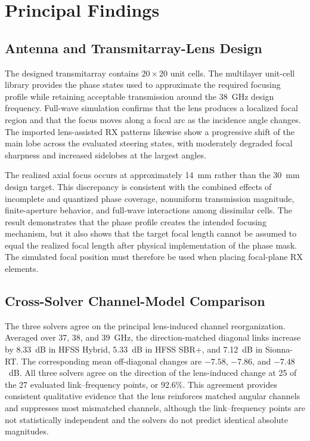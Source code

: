 \section{Principal Findings}

\subsection{Antenna and Transmitarray-Lens Design}

The designed transmitarray contains $20\times20$ unit cells. The multilayer unit-cell library provides the phase states used to approximate the required focusing profile while retaining acceptable transmission around the 38~GHz design frequency. Full-wave simulation confirms that the lens produces a localized focal region and that the focus moves along a focal arc as the incidence angle changes. The imported lens-assisted RX patterns likewise show a progressive shift of the main lobe across the evaluated steering states, with moderately degraded focal sharpness and increased sidelobes at the largest angles.

The realized axial focus occurs at approximately 14~mm rather than the 30~mm design target. This discrepancy is consistent with the combined effects of incomplete and quantized phase coverage, nonuniform transmission magnitude, finite-aperture behavior, and full-wave interactions among dissimilar cells. The result demonstrates that the phase profile creates the intended focusing mechanism, but it also shows that the target focal length cannot be assumed to equal the realized focal length after physical implementation of the phase mask. The simulated focal position must therefore be used when placing focal-plane RX elements.

\subsection{Cross-Solver Channel-Model Comparison}

The three solvers agree on the principal lens-induced channel reorganization. Averaged over 37, 38, and 39~GHz, the direction-matched diagonal links increase by 8.33~dB in HFSS Hybrid, 5.33~dB in HFSS SBR+, and 7.12~dB in Sionna-RT. The corresponding mean off-diagonal changes are $-7.58$, $-7.86$, and $-7.48$~dB. All three solvers agree on the direction of the lens-induced change at 25 of the 27 evaluated link--frequency points, or 92.6\%. This agreement provides consistent qualitative evidence that the lens reinforces matched angular channels and suppresses most mismatched channels, although the link--frequency points are not statistically independent and the solvers do not predict identical absolute magnitudes.

